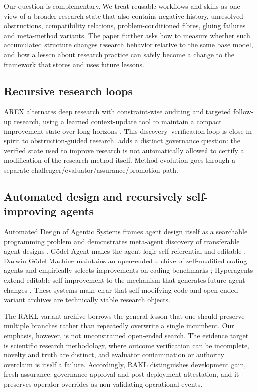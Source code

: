 Our question is complementary. We treat reusable workflows and skills as one view of a broader research state that also contains negative history, unresolved obstructions, compatibility relations, problem-conditioned fibres, gluing failures and meta-method variants. The paper further asks how to measure whether such accumulated structure changes research behavior relative to the same base model, and how a lesson about research practice can safely become a change to the framework that stores and uses future lessons.

\subsection{Recursive research loops}

AREX alternates deep research with constraint-wise auditing and targeted follow-up research, using a learned context-update tool to maintain a compact improvement state over long horizons \cite{lu2026arex}. This discovery--verification loop is close in spirit to obstruction-guided research. \RAKL{} adds a distinct governance question: the verified state used to improve research is not automatically allowed to certify a modification of the research method itself. Method evolution goes through a separate challenger/evaluator/assurance/promotion path.

\subsection{Automated design and recursively self-improving agents}

Automated Design of Agentic Systems frames agent design itself as a searchable programming problem and demonstrates meta-agent discovery of transferable agent designs \cite{hu2024adas}. G\"odel Agent makes the agent logic self-referential and editable \cite{yin2024godel}. Darwin G\"odel Machine maintains an open-ended archive of self-modified coding agents and empirically selects improvements on coding benchmarks \cite{zhang2025dgm}; Hyperagents extend editable self-improvement to the mechanism that generates future agent changes \cite{zhang2026hyperagents}. These systems make clear that self-modifying code and open-ended variant archives are technically viable research objects.

The RAKL variant archive borrows the general lesson that one should preserve multiple branches rather than repeatedly overwrite a single incumbent. Our emphasis, however, is not unconstrained open-ended search. The evidence target is scientific research methodology, where outcome verification can be incomplete, novelty and truth are distinct, and evaluator contamination or authority overclaim is itself a failure. Accordingly, RAKL distinguishes development gain, fresh assurance, governance approval and post-deployment attestation, and it preserves operator overrides as non-validating operational events.

